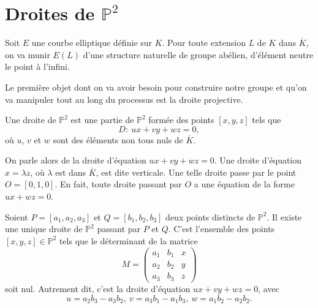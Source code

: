 \section{Droites de $\mathbb{P}^2$}
Soit $E$ une courbe elliptique définie sur $K$. Pour toute extension $L$ de $K$ dans $\overline{K}$, on va munir $E(L)$ d'une structure naturelle de groupe abélien, d'élément neutre le point à l'infini.

Le première objet dont on va avoir besoin pour construire notre groupe et qu'on va
manipuler tout au long du processus est la droite projective.

\begin{definition}
    Une droite de $\mathbb{P}^2$ est une partie de $\mathbb{P}^2$ formée des points $[x,y,z]$ tels que 
    \[
    D :\ ux+vy+wz=0
    ,\] 
    où $u$, $v$ et $w$ sont des éléments non tous nuls de $\overline{K}$.
\end{definition}

On parle alors de la droite d'équation $ux+vy+wz=0$. Une droite d'équation $x=\lambda z$, où $\lambda$ est dans $\overline{K}$, est dite verticale. Une telle droite passe par le point $O = [0,1,0]$. En fait, toute droite passant par $O$ a une équation de la forme $ux+wz=0$.

\begin{lemme}
    \label{lem:lemme2}

    Soient $P = \left[ a_1, a_2, a_3 \right]$ et $Q = \left[ b_1, b_2, b_3 \right]$ deux points
    distincts de $\mathbb{P}^2$. Il existe une unique droite de $\mathbb{P}^2$ passant par $P$ et $Q$. C'est l'ensemble des points $\left[ x, y, z \right] \in \mathbb{P}^2$ tels que le déterminant de la matrice
    \[
        M = 
    \begin{pmatrix}
        a_1 & b_1 & x \\ 
        a_2 & b_2 & y \\
        a_3 & b_3 & z
    \end{pmatrix}
    \] 
    soit nul. Autrement dit, c'est la droite d'équation $ux + vy + wz = 0$, avec
    \[
    u = a_2b_3 - a_3b_2, \ v = a_3b_1 - a_1b_3, \ w = a_1b_2 - a_2b_2
    .\] 
\end{lemme}

